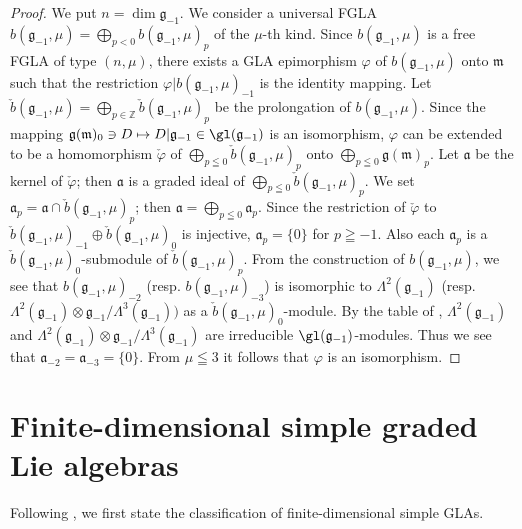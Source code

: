\begin{proof}
We put $n=\dim \mathfrak g_{-1}$. We consider a universal FGLA
$b(\mathfrak g_{-1},\mu)=\bigoplus\limits_{p<0}b(\mathfrak g_{-1},\mu)_p$ of
the $\mu$-th kind. Since $b(\mathfrak g_{-1},\mu)$
is a free FGLA of type $(n,\mu)$,
there exists a GLA epimorphism $\varphi$
of $b(\mathfrak g_{-1},\mu)$ onto $\mathfrak m$ such that the restriction
$\varphi|b(\mathfrak g_{-1},\mu)_{-1}$ is the identity mapping.
Let $\check{b}(\mathfrak g_{-1},\mu)
=\bigoplus\limits_{p\in\mathbb Z}\check{b}(\mathfrak g_{-1},\mu)_p$
be the prolongation of $b(\mathfrak g_{-1},\mu)$.
Since the mapping $\mathfrak g(\mathfrak m)_0\ni D\mapsto
D|\mathfrak g_{-1}\in\gl(\mathfrak g_{-1})$ is an isomorphism,
$\varphi$ can be extended to be a homomorphism $\check{\varphi}$
of $\bigoplus\limits_{p\leqq0}\check{b}(\mathfrak g_{-1},\mu)_p$ onto
$\bigoplus\limits_{p\leqq0}\mathfrak g(\mathfrak m)_p$.
Let $\mathfrak a$ be the kernel of $\check{\varphi}$;
then $\mathfrak a$ is a graded ideal of $\bigoplus\limits_{p\leqq0}\check{b}(\mathfrak g_{-1},\mu)_p$. We set $\mathfrak a_p
=\mathfrak a\cap \check{b}(\mathfrak g_{-1},\mu)_p$; then
$\mathfrak a=\bigoplus\limits_{p\leqq 0}\mathfrak a_p$.
Since the restriction of $\check{\varphi}$ to $\check{b}(\mathfrak g_{-1},\mu)_{-1}
\oplus \check{b}(\mathfrak g_{-1},\mu)_0$ is injective,
$\mathfrak a_p=\{0\}$ for $p\geqq-1$. Also
each $\mathfrak a_p$ is a $\check{b}(\mathfrak g_{-1},\mu)_0$-submodule of
$\check{b}(\mathfrak g_{-1},\mu)_p$.
From the construction of $b(\mathfrak g_{-1},\mu)$, we see that
$b(\mathfrak g_{-1},\mu)_{-2}$ (resp. $b(\mathfrak g_{-1},\mu)_{-3}$) is
isomorphic to
$\Lambda^2(\mathfrak g_{-1})$
(resp.\ $\Lambda^2(\mathfrak g_{-1})\otimes \mathfrak g_{-1}/
\Lambda^3(\mathfrak g_{-1}))$ as a $\check{b}(\mathfrak g_{-1},\mu)_0$-module.
By the table of \cite{ov90:1},
$\Lambda^2(\mathfrak g_{-1})$ and $\Lambda^2(\mathfrak g_{-1})\otimes
\mathfrak g_{-1}/\Lambda^3(\mathfrak g_{-1})$ are irreducible
$\gl(\mathfrak g_{-1})$-modules.
Thus we see that $\mathfrak a_{-2}=\mathfrak a_{-3}=\{0\}$.
From $\mu\leqq3$ it follows that $\varphi$ is an isomorphism.
\end{proof}


\section{Finite-dimensional simple graded Lie algebras}\label{section5}

Following \cite{yam93:1}, we f\/irst state the classif\/ication of
f\/inite-dimensional simple GLAs.

